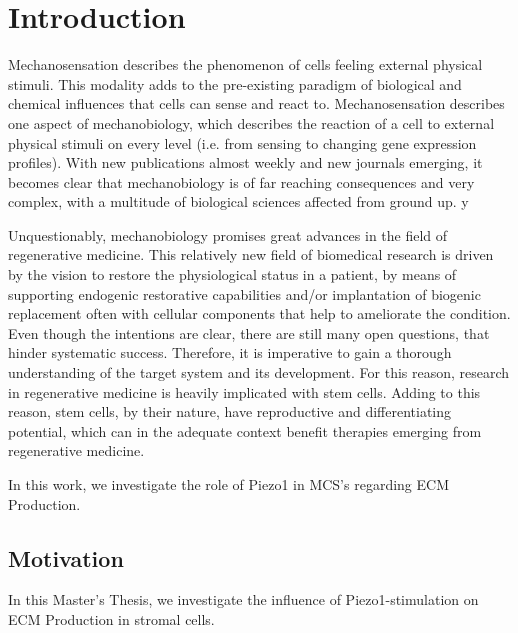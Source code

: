 \newcommand{\package}{\emph}


\chapter{Introduction}

Mechanosensation describes the phenomenon of cells feeling external physical stimuli.  This modality adds to the pre-existing paradigm of biological and chemical influences that cells can sense and react to. Mechanosensation describes one aspect of mechanobiology, which describes the reaction of a cell to external physical stimuli on every level (i.e. from sensing to changing gene expression profiles).  With new publications almost weekly and new journals emerging, it becomes clear that mechanobiology is of far reaching consequences and very complex, with a multitude of biological sciences affected from ground up. 
y\par 

Unquestionably, mechanobiology promises great advances in the field of regenerative medicine. This relatively new field of biomedical research is driven by the vision to restore the physiological status in a patient, by means of supporting endogenic restorative capabilities and/or implantation of biogenic replacement often with cellular components that help to ameliorate the condition.  Even though the intentions are clear, there are still many open questions, that hinder systematic success. Therefore, it is imperative to gain a thorough understanding of the target system and its development. For this reason, research in regenerative medicine is heavily implicated with stem cells. Adding to this reason, stem cells, by their nature, have reproductive and differentiating potential, which can in the adequate context benefit therapies emerging from regenerative medicine. 
\par


In this work, we investigate the role of Piezo1 in MCS's regarding ECM Production.


\section{Motivation}
\label{sec:motivation}

In this Master's Thesis, we investigate the influence of Piezo1-stimulation on ECM Production in stromal cells.

